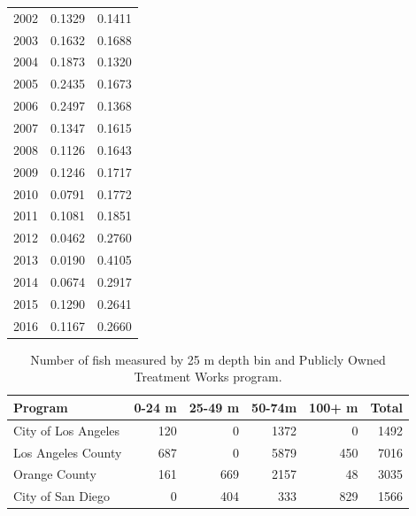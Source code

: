 \documentclass[12pt,]{article}
\begin{document}
\begin{table}[ht]
{\begin{tabular}{rrr}
   2002 & 0.1329 & 0.1411 \\ 
   2003 & 0.1632 & 0.1688 \\ 
   2004 & 0.1873 & 0.1320 \\ 
   2005 & 0.2435 & 0.1673 \\ 
   2006 & 0.2497 & 0.1368 \\ 
   2007 & 0.1347 & 0.1615 \\ 
   2008 & 0.1126 & 0.1643 \\ 
   2009 & 0.1246 & 0.1717 \\ 
   2010 & 0.0791 & 0.1772 \\ 
   2011 & 0.1081 & 0.1851 \\ 
   2012 & 0.0462 & 0.2760 \\ 
   2013 & 0.0190 & 0.4105 \\ 
   2014 & 0.0674 & 0.2917 \\ 
   2015 & 0.1290 & 0.2641 \\ 
   2016 & 0.1167 & 0.2660 \\ 
   \hline
\end{tabular}
}
\end{table}\begin{table}[ht]
\centering
\caption{Number of fish measured by 25 m 
                                              depth bin and Publicly Owned Treatment Works program.} 
\label{tab:Fleet7_lengthdepth}
\begin{tabular}{lrrrrr}
  \hline
Program & 0-24 m & 25-49 m & 50-74m & 100+ m & Total \\ 
  \hline
City of Los Angeles & 120 &   0 & 1372 &   0 & 1492 \\ 
  Los Angeles County & 687 &   0 & 5879 & 450 & 7016 \\ 
  Orange County & 161 & 669 & 2157 &  48 & 3035 \\ 
  City of San Diego &   0 & 404 & 333 & 829 & 1566 \\ 
   \hline
\end{tabular}
\end{table}

\newpage
\end{document}
